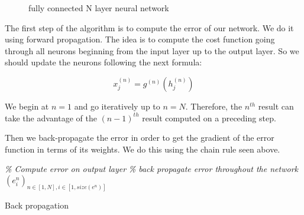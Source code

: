 \begin{figure}

		\caption{fully connected N layer neural network}
		\label{fig:back_prop2}
	\end{figure}

	The first step of the algorithm is to compute the error of our network. We do it using forward propagation. The idea is to compute the cost function going through all neurons beginning from the input layer up to the output layer. So we should update the neurons following the next formula:

	\begin{equation}
		x_j^{(n)} = g^{(n)}(h_j^{(n)})
	\end{equation}

	We begin at $n=1$ and go iteratively up to $n=N$. Therefore, the $n^{th}$ result can take the advantage of the $(n-1)^{th}$ result computed on a preceding step.

	
	Then we back-propagate the error in order to get the gradient of the error function in terms of its weights. We do this using the chain rule seen above.

	\begin{algorithm}[H]
		\BlankLine
		\emph{\% Compute error on output layer}\;
		\emph{\% back propagate error throughout the network}\;
		\Return $(e_i^n)_{n\in[1,N], i\in[1,size(e^n)]}$
	\caption{Back propagation}
	\label{alg:back_propagation}
	\end{algorithm}
	
